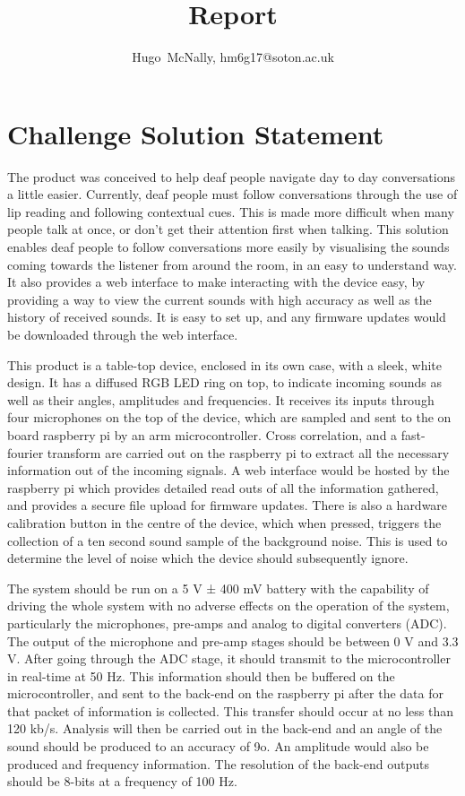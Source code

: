 \documentclass[a4paper]{article}
\begin{document}
\title{Report}
\author{Hugo~McNally,
        hm6g17@soton.ac.uk}
\maketitle


\section{Challenge Solution Statement}
The product was conceived to help deaf people navigate day to day conversations
a little easier. Currently, deaf people must follow conversations through the
use of lip reading and following contextual cues. This is made more difficult
when many people talk at once, or don’t get their attention first when talking.
This solution enables deaf people to follow conversations more easily by
visualising the sounds coming towards the listener from around the room, in an
easy to understand way. It also provides a web interface to make interacting
with the device easy, by providing a way to view the current sounds with high
accuracy as well as the history of received sounds. It is easy to set up, and
any firmware updates would be downloaded through the web interface.

This product is a table-top device, enclosed in its own case, with a sleek,
white design. It has a diffused RGB LED ring on top, to indicate incoming sounds
as well as their angles, amplitudes and frequencies. It receives its inputs
through four microphones on the top of the device, which are sampled and sent to
the on board raspberry pi by an arm microcontroller. Cross correlation, and a
fast-fourier transform are carried out on the raspberry pi to extract all the
necessary information out of the incoming signals. A web interface would be
hosted by the raspberry pi which provides detailed read outs of all the
information gathered, and provides a secure file upload for firmware updates.
There is also a hardware calibration button in the centre of the device, which
when pressed, triggers the collection of a ten second sound sample of the
background noise. This is used to determine the level of noise which the device
should subsequently ignore.

The system should be run on a 5 V ± 400 mV battery with the capability of
driving the whole system with no adverse effects on the operation of the system,
particularly the microphones, pre-amps and analog to digital converters (ADC).
The output of the microphone and pre-amp stages should be between 0 V and 3.3 V.
After going through the ADC stage, it should transmit to the microcontroller in
real-time at 50 Hz. This information should then be buffered on the
microcontroller, and sent to the back-end on the raspberry pi after the data for
that packet of information is collected. This transfer should occur at no less
than 120 kb/s. Analysis will then be carried out in the back-end and an angle of
the sound should be produced to an accuracy of 9o. An amplitude would also be
produced and frequency information. The resolution of the back-end outputs
should be 8-bits at a frequency of 100 Hz.
\end{document}
